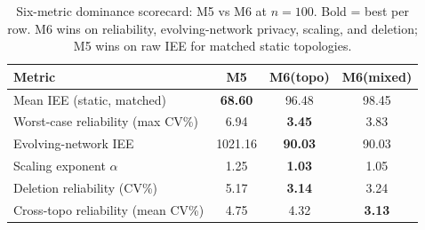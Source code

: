\begin{table}[htbp]
\caption{Six-metric dominance scorecard: M5 vs M6 at $n=100$. Bold = best per row. M6 wins on reliability, evolving-network privacy, scaling, and deletion; M5 wins on raw IEE for matched static topologies.}
\label{tab:m6_scorecard}
\centering
\scriptsize
\renewcommand{\arraystretch}{1.15}
\begin{tabular}{lccc}
\toprule
Metric & M5 & M6(topo) & M6(mixed) \\
\midrule
Mean IEE (static, matched) & \textbf{68.60} & 96.48 & 98.45 \\
Worst-case reliability (max CV\%) & 6.94 & \textbf{3.45} & 3.83 \\
Evolving-network IEE & 1021.16 & \textbf{90.03} & 90.03 \\
Scaling exponent $\alpha$ & 1.25 & \textbf{1.03} & 1.05 \\
Deletion reliability (CV\%) & 5.17 & \textbf{3.14} & 3.24 \\
Cross-topo reliability (mean CV\%) & 4.75 & 4.32 & \textbf{3.13} \\
\bottomrule
\end{tabular}
\end{table}
